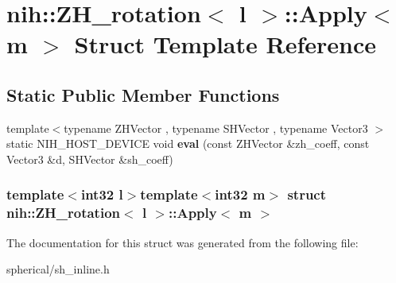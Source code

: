 \hypertarget{structnih_1_1_z_h__rotation_1_1_apply}{
\section{nih\-:\-:\-Z\-H\-\_\-rotation$<$ l $>$\-:\-:\-Apply$<$ m $>$ \-Struct \-Template \-Reference}
\label{structnih_1_1_z_h__rotation_1_1_apply}
}
\subsection*{\-Static \-Public \-Member \-Functions}
\begin{DoxyCompactItemize}
\item 
\hypertarget{structnih_1_1_z_h__rotation_1_1_apply_a879b6f830c072283d6467cffbd25c9d9}{
{\footnotesize template$<$typename Z\-H\-Vector , typename S\-H\-Vector , typename Vector3 $>$ }\\static \-N\-I\-H\-\_\-\-H\-O\-S\-T\-\_\-\-D\-E\-V\-I\-C\-E void {\bfseries eval} (const \-Z\-H\-Vector \&zh\-\_\-coeff, const \-Vector3 \&d, \-S\-H\-Vector \&sh\-\_\-coeff)}
\label{structnih_1_1_z_h__rotation_1_1_apply_a879b6f830c072283d6467cffbd25c9d9}

\end{DoxyCompactItemize}
\subsubsection*{template$<$int32 l$>$template$<$int32 m$>$ struct nih\-::\-Z\-H\-\_\-rotation$<$ l $>$\-::\-Apply$<$ m $>$}



\-The documentation for this struct was generated from the following file\-:\begin{DoxyCompactItemize}
\item 
spherical/sh\-\_\-inline.\-h\end{DoxyCompactItemize}
